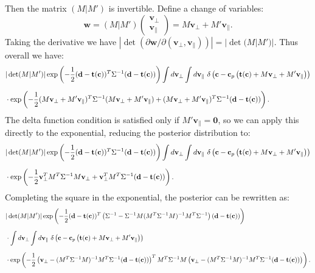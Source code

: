 \documentclass[withindex,glossary]{cam-thesis}
\renewcommand{\vec}[1]{\textbf{#1}} %
\begin{document}
Then the matrix $(M|M')$ is invertible. Define a change of variables:
\begin{equation}
\vec{w} = (M|M') \begin{pmatrix} \vec{v}_{\perp} \\ \vec{v}_{\parallel} \end{pmatrix} = M\vec{v}_{\perp} + M'\vec{v}_{\parallel}.
\end{equation}
Taking the derivative we have $|\det(\partial \vec{w} / \partial (\vec{v}_{\perp}, \vec{v}_{\parallel}))| = |\det(M|M')|$. Thus overall we have:
\begin{align}
& |\det(M|M')|\exp\left( -\frac{1}{2}(\vec{d} - \vec{t}(\vec{c}))^T\Sigma^{-1} (\vec{d} - \vec{t}(\vec{c})) \right) \int d\vec{v}_{\perp} \int d\vec{v}_{\parallel}\ \delta\left(\vec{c} - \vec{c}_p\left(\vec{t}(\vec{c}) + M\vec{v}_{\perp} + M'\vec{v}_{\parallel}\right) \right)\notag\\[1.5ex]
& \cdot \exp\left( -\frac{1}{2} (M\vec{v}_{\perp} + M' \vec{v}_{\parallel})^T \Sigma^{-1} (M\vec{v}_{\perp} + M' \vec{v}_{\parallel}) + (M\vec{v}_{\perp} + M' \vec{v}_{\parallel})^T \Sigma^{-1} (\vec{d} - \vec{t}(\vec{c})) \right).
\end{align}
The delta function condition is satisfied only if $M'\vec{v}_{\parallel} = \vec{0}$, so we can apply this directly to the exponential, reducing the posterior distribution to:
\begin{align}
&|\det(M|M')| \exp\left( -\frac{1}{2}(\vec{d} - \vec{t}(\vec{c}))^T\Sigma^{-1} (\vec{d} - \vec{t}(\vec{c})) \right) \int d\vec{v}_{\perp} \int d\vec{v}_{\parallel}\ \delta\left(\vec{c} - \vec{c}_p\left(\vec{t}(\vec{c}) + M\vec{v}_{\perp} + M'\vec{v}_{\parallel}\right) \right)\notag\\[1.5ex]
& \cdot \exp\left( -\frac{1}{2} \vec{v}_{\perp}^T M^T \Sigma^{-1}M \vec{v}_{\perp} + \vec{v}_{\perp}^T M^T \Sigma^{-1} (\vec{d} - \vec{t}(\vec{c})) \right).
\end{align}
Completing the square in the exponential, the posterior can be rewritten as:
\begin{align}
& |\det(M|M')|\exp\left( -\frac{1}{2}(\vec{d} - \vec{t}(\vec{c}))^T \left( \Sigma^{-1} - \Sigma^{-1} M (M^T\Sigma^{-1}M)^{-1} M^T \Sigma^{-1}\right) (\vec{d} - \vec{t}(\vec{c})) \right) \notag\\[1.5ex]
& \cdot \int d\vec{v}_{\perp} \int d\vec{v}_{\parallel}\ \delta\left(\vec{c} - \vec{c}_p\left(\vec{t}(\vec{c}) + M\vec{v}_{\perp} + M'\vec{v}_{\parallel}\right) \right)\notag\\[1.5ex]
& \cdot \exp\left( -\frac{1}{2} \left(\vec{v}_{\perp} - (M^T \Sigma^{-1}M)^{-1} M^T \Sigma^{-1} (\vec{d} - \vec{t}(\vec{c}))\right)^T M^T \Sigma^{-1}M \left(\vec{v}_{\perp} - (M^T \Sigma^{-1}M)^{-1} M^T \Sigma^{-1} (\vec{d} - \vec{t}(\vec{c}))\right) \right).
\end{align}
\end{document}
